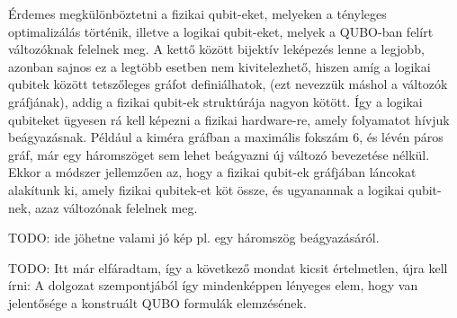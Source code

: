 Érdemes megkülönböztetni a fizikai qubit-eket, melyeken a tényleges optimalizálás történik, illetve a logikai qubit-eket, melyek a QUBO-ban felírt változóknak felelnek meg. A kettő között bijektív leképezés lenne a legjobb, azonban sajnos ez a legtöbb esetben nem kivitelezhető, hiszen amíg a logikai qubitek között tetszőleges gráfot definiálhatok, (ezt nevezzük máshol a változók gráfjának), addig a fizikai qubit-ek struktúrája nagyon kötött. Így a logikai qubiteket ügyesen rá kell képezni a fizikai hardware-re, amely folyamatot hívjuk beágyazásnak.
Például a kiméra gráfban a maximális fokszám 6, és lévén páros gráf, már egy háromszöget sem lehet beágyazni új változó bevezetése nélkül. Ekkor a módszer jellemzően az, hogy a fizikai qubit-ek gráfjában láncokat alakítunk ki, amely fizikai qubitek-et köt össze, és ugyanannak a logikai qubit-nek, azaz változónak felelnek meg.

TODO: ide jöhetne valami jó kép pl. egy háromszög beágyazásáról.

TODO: Itt már elfáradtam, így a következő mondat kicsit értelmetlen, újra kell írni:
A dolgozat szempontjából így mindenképpen lényeges elem, hogy van jelentősége a konstruált QUBO formulák elemzésének. 